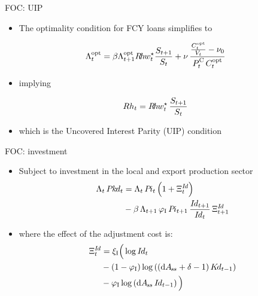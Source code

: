   \begin{frame}{FOC: UIP}
    \begin{itemize}
    \item The optimality condition for FCY loans simplifies to    
  \end{itemize}
  \vspace*{-3ex}
  \begin{align*}
     \Lambda^\opt_t =\beta\Lambda^\opt_{t+1} \Rhw_t \frac{S_{t+1}}{S_t} + \nu\,\frac{\frac{C^\opt_t}{V_t}-\nu_0}{P^\cc_t\,{C^\opt_t}}
  \end{align*}
  \vspace*{-2ex}
  \begin{itemize}
    \item implying   
  \end{itemize}
  \vspace*{-2ex}
  \begin{align*}
     Rh_t = R\hspace{-0.15em}h\hspace{-0.075em}w^{\star}_t \, \frac{S_{t+1}}{S_t} 
  \end{align*}
  \vspace*{-2ex}
  \begin{itemize}
    \item which is the Uncovered Interest Parity (UIP) condition
   \end{itemize}
  \end{frame}    

   
  \begin{frame}{FOC: investment}
   \vspace{-5mm}
    \begin{itemize}
   \item Subject to investment in the local and export production sector 
     \begin{align}
      \small
      \Lambda_t\,\Pkd_t &= \Lambda_t\,\Pii_t\,\Big(1 + \Xi^{\Id}_t\Big) \notag\\
      & - \beta\,\Lambda_{t+1} \, \varphi_{\ii} \, \Pii_{t+1}\,\frac{\Id_{t+1}}{\Id_{t}} \, \Xi^{\Id}_{t+1}
       \end{align}
     \item where the effect of the adjustment cost is:
     \vspace{-5mm}
     \begin{align}
      \small
      \Xi^{\Id}_t &=  \xi_{\ii } \Big(\log\Id_t \notag\\
      &-(1-\varphi_{\ii})\log\left((\sst{\gr A} + \delta -1) \, \Kd_{t-1}\right) \notag\\
       &- \varphi_{\ii} \log \left( \sst{\gr A} \, \Id_{t-1}\right) \Big)
       \end{align}
    \end{itemize}
   \end{frame}   

